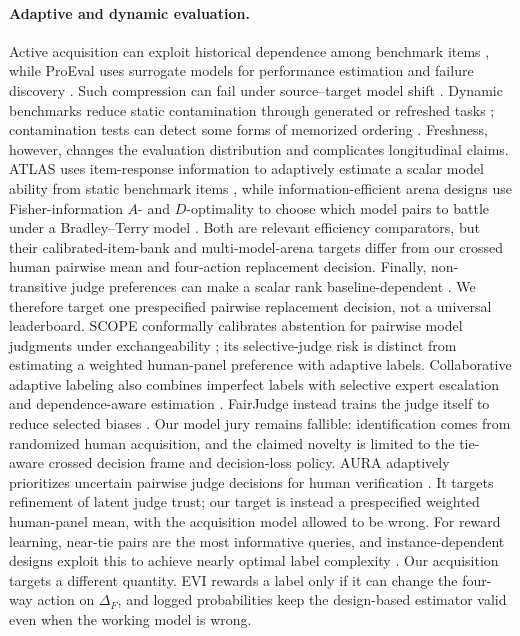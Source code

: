 \documentclass{article}
\begin{document}
\paragraph{Adaptive and dynamic evaluation.}
Active acquisition can exploit historical dependence among benchmark items
\cite{li2025active}, while ProEval uses surrogate models for performance
estimation and failure discovery \cite{huang2026proeval}. Such compression can
fail under source--target model shift \cite{zhang2025fewer}. Dynamic benchmarks
reduce static contamination through generated or refreshed tasks
\cite{zhu2024dyval,white2025livebench}; contamination tests can detect some
forms of memorized ordering \cite{oren2024contamination}. Freshness, however,
changes the evaluation distribution and complicates longitudinal claims.
ATLAS uses item-response information to adaptively estimate a scalar model
ability from static benchmark items \cite{li2025atlas}, while information-efficient
arena designs use Fisher-information $A$- and $D$-optimality to choose which
model pairs to battle under a Bradley--Terry model
\cite{liu2026fewerbattles}. Both are relevant
efficiency comparators, but their calibrated-item-bank and multi-model-arena
targets differ from our
crossed human pairwise mean and four-action replacement decision.
Finally, non-transitive judge preferences can make a scalar rank
baseline-dependent \cite{xu2025nontransitivity}. We therefore target one
prespecified pairwise replacement decision, not a universal leaderboard.
SCOPE conformally calibrates abstention for pairwise model judgments under
exchangeability \cite{badshah2026scope}; its selective-judge risk is distinct
from estimating a weighted human-panel preference with adaptive labels.
Collaborative adaptive labeling also combines imperfect labels with selective
expert escalation and dependence-aware estimation
\cite{ruan2026collaborative}. FairJudge instead trains the judge itself to
reduce selected biases \cite{yang2026fairjudge}. Our model jury remains
fallible: identification comes from randomized human acquisition, and the
claimed novelty is limited to the tie-aware crossed decision frame and
decision-loss policy.
AURA adaptively prioritizes uncertain pairwise judge decisions for human
verification \cite{zhang2026aura}. It targets refinement of latent judge trust;
our target is instead a prespecified weighted human-panel mean, with the
acquisition model allowed to be wrong.
For reward learning, near-tie pairs are the most informative queries, and
instance-dependent designs exploit this to achieve nearly optimal label
complexity \cite{zhao2026activepref}. Our acquisition targets a different
quantity. EVI rewards a label only if it can change the four-way action on
$\Delta_F$, and logged probabilities keep the design-based estimator valid
even when the working model is wrong.
\end{document}
